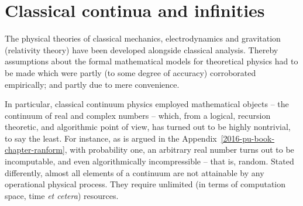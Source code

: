 %
%
%

\chapter{Classical continua and infinities}
\label{2016-pu-book-chapter-cc} %

The physical theories of classical mechanics, electrodynamics  and gravitation (relativity theory)
have been developed alongside classical analysis.
Thereby assumptions about the formal mathematical models for theoretical physics
had to be made which were partly (to some degree of accuracy) corroborated empirically;
and partly due to mere convenience.

In particular, classical continuum physics employed mathematical objects
-- the continuum of real and complex numbers --
which, from a logical, recursion theoretic, and algorithmic point of view,
has turned out to be highly nontrivial, to say the least.
For instance,
as is argued in the Appendix~\ref{2016-pu-book-chapter-ranform},
with probability one,
an arbitrary real number turns out to be incomputable,
and even algorithmically incompressible -- that is,
random.
Stated differently, almost all elements of a continuum are
not attainable by any operational physical process.
They require unlimited (in terms of computation space, time {\it et cetera}) resources.

